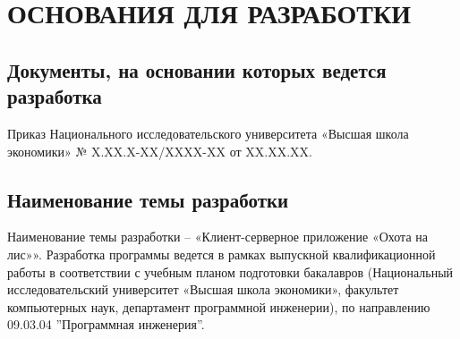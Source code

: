 \section{ОСНОВАНИЯ ДЛЯ РАЗРАБОТКИ}

\subsection{Документы, на основании которых ведется разработка}
Приказ Национального исследовательского университета «Высшая школа экономики» № X.XX.X-XX/XXXX-XX от XX.XX.XX.

\subsection{Наименование темы разработки}
Наименование темы разработки – «Клиент-серверное приложение «Охота на лис»». Разработка программы ведется в рамках выпускной квалификационной работы в соответствии с учебным планом подготовки бакалавров (Национальный исследовательский университет «Высшая школа экономики», факультет компьютерных наук, департамент программной инженерии), по направлению 09.03.04 ”Программная инженерия”.

\clearpage